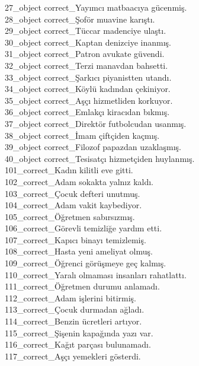 \begin{myparindent}{0pt}
27\_object correct\_Yayımcı matbaacıya gücenmiş. \\
28\_object correct\_Şoför muavine karıştı. \\
29\_object correct\_Tüccar madenciye ulaştı. \\
30\_object correct\_Kaptan denizciye inanmış. \\
31\_object correct\_Patron avukate güvendi. \\
32\_object correct\_Terzi manavdan bahsetti. \\
33\_object correct\_Şarkıcı piyanistten utandı. \\
34\_object correct\_Köylü kadından çekiniyor. \\
35\_object correct\_Aşçı hizmetliden korkuyor. \\
36\_object correct\_Emlakçı kiracıdan bıkmış. \\
37\_object correct\_Direktör futbolcudan usanmış. \\
38\_object correct\_İmam çiftçiden kaçmış. \\
39\_object correct\_Filozof papazdan uzaklaşmış. \\
40\_object correct\_Tesisatçı hizmetçiden huylanmış. \\
101\_correct\_Kadın kilitli eve gitti. \\
102\_correct\_Adam sokakta yalnız kaldı. \\
103\_correct\_Çocuk defteri unutmuş. \\
104\_correct\_Adam vakit kaybediyor. \\
105\_correct\_Öğretmen sabırsızmış. \\
106\_correct\_Görevli temizliğe yardım etti. \\
107\_correct\_Kapıcı binayı temizlemiş. \\
108\_correct\_Hasta yeni ameliyat olmuş. \\
109\_correct\_Öğrenci görüşmeye geç kalmış. \\
110\_correct\_Yaralı olmaması insanları rahatlattı. \\
111\_correct\_Öğretmen durumu anlamadı. \\
112\_correct\_Adam işlerini bitirmiş. \\
113\_correct\_Çocuk durmadan ağladı. \\
114\_correct\_Benzin ücretleri artıyor. \\
115\_correct\_Şişenin kapağında yazı var. \\
116\_correct\_Kağıt parçası bulunamadı. \\
117\_correct\_Aşçı yemekleri gösterdi. \\

\end{myparindent}
